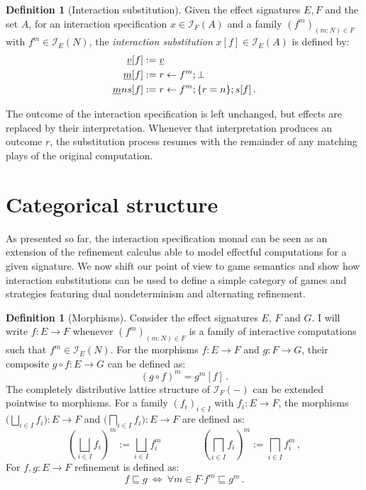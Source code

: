 \documentclass[11pt,oneside]{book}
\theoremstyle{definition}
\newtheorem{definition}[theorem]{Definition}
\newcommand{\bdot}{\boldsymbol{\cdot}}
\newcommand{\ul}[1]{%
  \underline{\smash{#1}}
}
\begin{document}
\begin{definition}[Interaction substitution]
Given the effect signatures $E, F$ and the set $A$,
for an interaction specification $x \in \mathcal{I}_F(A)$
and a family $(f^m)_{(m \mathbin: N) \in F}$
with $f^m \in \mathcal{I}_E(N)$,
the \emph{interaction substitution} $x[f] \in \mathcal{I}_E(A)$
is defined by:
\begin{align*}
  \ul{v}[f] &:= \ul{v} \\
  \ul{m}[f] &:= r \leftarrow f^m ; \bot \\
  \ul{m}ns[f] &:= r \leftarrow f^m ; \{r = n\} ; s[f] \,.
\end{align*}
\end{definition}


The outcome of the interaction specification is left unchanged,
but effects are replaced by their interpretation.
Whenever that interpretation produces an outcome $r$,
the substitution process resumes with the remainder of any
matching plays of the original computation.


\section{Categorical structure} \label{sec:intm:cat} %

As presented so far,
the interaction specification monad
can be seen as an extension of the refinement calculus
able to model effectful computations
for a given signature.
We now shift our point of view to game semantics
and show how interaction substitutions
can be used to define a simple category of games and strategies
featuring dual nondeterminism and alternating refinement.

\begin{definition}[Morphisms]
Consider the effect signatures $E$, $F$ and $G$.
I will write $f : E \rightarrow F$
whenever $(f^m)_{(m \mathbin: N) \in F}$ is a family of interactive computations
such that $f^m \in \mathcal{I}_E(N)$.
For the morphisms $f : E \rightarrow F$ and $g : F \rightarrow G$,
their composite $g \circ f : E \rightarrow G$ can be defined as:
\[ (g \circ f)^m = g^m[f] \,. \]
The completely distributive lattice structure
of $\mathcal{I}_F(-)$ can be extended pointwise
to morphisms.
For a family $(f_i)_{i \in I}$
with $f_i : E \rightarrow F$,
the morphisms
$\big( \bigsqcup_{i \in I} f_i \big) : E \rightarrow F$ and
$\big( \bigsqcap_{i \in I} f_i \big) : E \rightarrow F$
are defined as:
\[
  \left( \bigsqcup_{i \in I} f_i \right)^m :=
    \bigsqcup_{i \in I} f_i^m
  \qquad
  \qquad
  \left( \bigsqcap_{i \in I} f_i \right)^m :=
    \bigsqcap_{i \in I} f_i^m \,,
\]
For $f, g : E \rightarrow F$
refinement is defined as:
\[
    f \sqsubseteq g \: \Leftrightarrow \:
    \forall m \in F \bdot f^m \sqsubseteq g^m \,.
\]
\end{definition}
\end{document}
